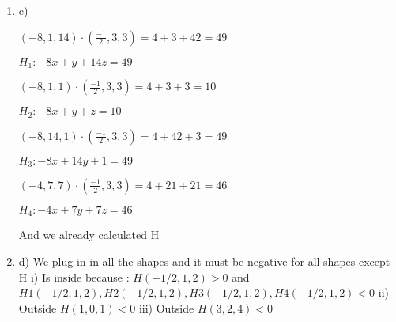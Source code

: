 \documentclass{article}
\begin{document}
\begin{enumerate}
        \item c)
        
        $(- 8, 1, 14) \cdot  (\frac{-1}{2},3,3) = 4 + 3 + 42 = 49$

        $H_1 : - 8x + y + 14z = 49$

        $(-8, 1, 1)  \cdot (\frac{-1}{2},3,3) = 4 + 3 + 3 = 10$

        $H_2 : - 8x + y + z = 10$

        $(-8, 14, 1) \cdot (\frac{-1}{2},3,3) = 4 + 42 + 3 = 49 $

        $H_3 : - 8x + 14y + 1 = 49$

        $(-4, 7, 7) \cdot (\frac{-1}{2},3,3) = 4 + 21 + 21 = 46$

        $H_4 : - 4x + 7y + 7z = 46$

        And we already calculated H

        \item d)
        We plug in in all the shapes and it must be negative for all shapes except H
        i)
        Is inside because :
        $H(-1/2, 1, 2) > 0$ and  $H1(-1/2, 1, 2),  H2(-1/2, 1, 2),  H3(-1/2, 1, 2),  H4(-1/2, 1, 2) < 0$
        ii)
        Outside
        $H(1, 0, 1) < 0 $
        iii)
        Outside 
        $H(3, 2, 4) < 0 $

    \end{enumerate}
\end{document}
